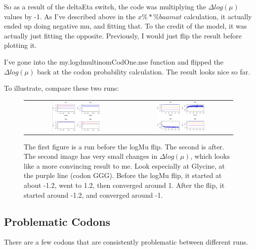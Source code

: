 So as a result of the deltaEta switch, the code was multiplying the $\Delta log(\mu)$ values by -1. As I've described above in the $x \%*\% baamat$ calculation, it actually ended up doing negative mu, and fitting that. To the credit of the model, it was actually just fitting the opposite. Previously, I would just flip the result before plotting it.

I've gone into the my.logdmultinomCodOne.nse function and flipped the $\Delta log(\mu)$ back at the codon probability calculation. The result looks nice so far.

To illustrate, compare these two runs:

\begin{figure}[h!]
\caption{The first figure is a run before the logMu flip. The second is after. The second image has very small changes in $\Delta log(\mu)$, which looks like a more convincing result to me. Look especially at Glycine, at the purple line (codon GGG). Before the logMu flip, it started at about -1.2, went to 1.2, then converged around 1. After the flip, it started around -1.2, and converged around -1.}
\begin{tabular}{c|c}
\includegraphics[width=0.48\textwidth]{data/logmu-nomflip.png}
&
\includegraphics[width=0.48\textwidth]{data/logmu-mflip.png}
\end{tabular}
\end{figure}



\subsection{Problematic Codons}
There are a few codons that are consistently problematic between different runs.

